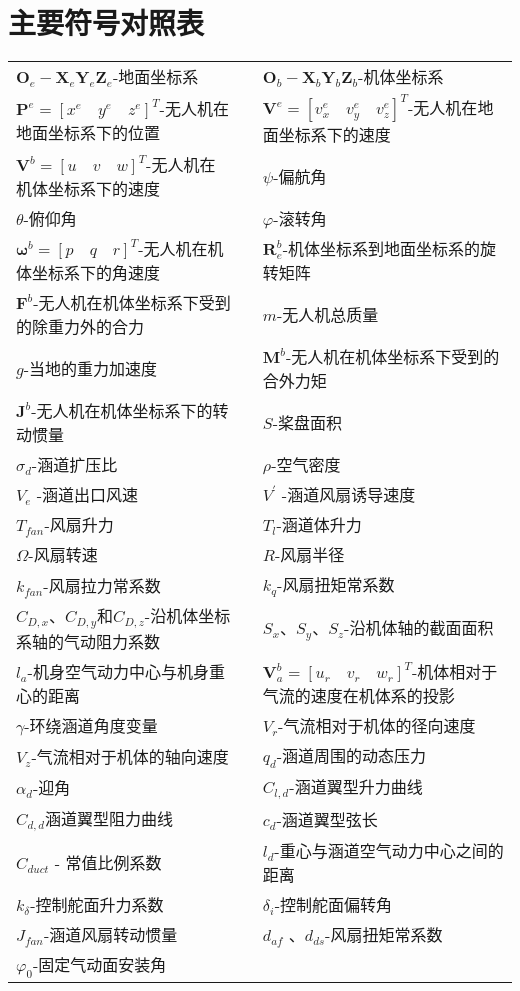 \chapter{主要符号对照表}

\begin{table}
	\centering{}%
	\begin{tabular}{l>{\centering}p{0.5cm}l}
	 $ \boldsymbol{O}_e-\boldsymbol{X}_e\boldsymbol{Y}_e\boldsymbol{Z}_e $-地面坐标系  &  & ${\boldsymbol{O}_b}-{\boldsymbol{X}_b}{\boldsymbol{Y}_b}{\boldsymbol{Z}_b}$-机体坐标系\tabularnewline
     $\boldsymbol{P}^{e}=[{x}^{e} \quad {y}^{e} \quad {z}^{e}]^{T}$-无人机在地面坐标系下的位置 &  & $\boldsymbol{V}^{e}=[{v}^{e}_{x} \quad {v}^{e}_{y} \quad {v}^{e}_{z}]^{T}$-无人机在地面坐标系下的速度\tabularnewline
     $\boldsymbol{V}^{b}=[{u} \quad {v} \quad {w}]^{T}$-无人机在机体坐标系下的速度 && $ \psi $-偏航角\tabularnewline
	 $\theta$-俯仰角                                                    && $\varphi$-滚转角\tabularnewline
     $\boldsymbol{\omega}^b=[p \quad q \quad r]^T$-无人机在机体坐标系下的角速度 && $\boldsymbol{R}_e^b$-机体坐标系到地面坐标系的旋转矩阵\tabularnewline
	 $\boldsymbol{F}^b$-无人机在机体坐标系下受到的除重力外的合力  							  &  &   $m $-无人机总质量\tabularnewline
	 $ g $-当地的重力加速度								&  &  $\boldsymbol{M}^b$-无人机在机体坐标系下受到的合外力矩\tabularnewline
	 $\boldsymbol{J}^b$-无人机在机体坐标系下的转动惯量 		    &  &   $S$-桨盘面积\tabularnewline
	 $ \sigma_d $-涵道扩压比 	&  &  $\rho$-空气密度\tabularnewline
	  $V_e$	-涵道出口风速							  &  &  $V^{\prime}$	-涵道风扇诱导速度\tabularnewline
      $T_{fan}$-风扇升力  						 &  &  $T_l$-涵道体升力\tabularnewline
	 $\Omega$-风扇转速 							 &  &  $R$-风扇半径\tabularnewline
	 $k_{fan}$-风扇拉力常系数 							 &  &  $k_{q}$-风扇扭矩常系数\tabularnewline
     $C_{D,x}$、$C_{D,y}$和$C_{D,z}$-沿机体坐标系轴的气动阻力系数  &  &  $S_x $、$ S_y $、$ S_z $-沿机体轴的截面面积\tabularnewline
	 $l_{a}$-机身空气动力中心与机身重心的距离   			  &  &  $\boldsymbol{V}_a^b= [ u_r \quad v_r \quad w_r ]^T$-机体相对于气流的速度在机体系的投影\tabularnewline
     $\gamma$-环绕涵道角度变量 						  &  &  ${{V}_r}$-气流相对于机体的径向速度\tabularnewline 
    ${{V}_z}$-气流相对于机体的轴向速度   &  &  ${{q}_d}$-涵道周围的动态压力\tabularnewline
     $ \alpha_d $-迎角 							 &  &  $C_{l, d}$-涵道翼型升力曲线\tabularnewline
	 $C_{d, d}$涵道翼型阻力曲线  		      &  &  $c_d$-涵道翼型弦长\tabularnewline 
     $C_{d u c t}$ - 常值比例系数  					&  &  $l_{d}$-重心与涵道空气动力中心之间的距离\tabularnewline
	 $k_{\delta}$-控制舵面升力系数 				 &  &  $\delta_i$-控制舵面偏转角\tabularnewline
	 $ J_{fan}$-涵道风扇转动惯量  						   &  &  $ d_{af} $ 、$ d_{ds} $-风扇扭矩常系数\tabularnewline
	 ${\varphi}_{0}$-固定气动面安装角  						&  & \tabularnewline 					
	\end{tabular}
\end{table}